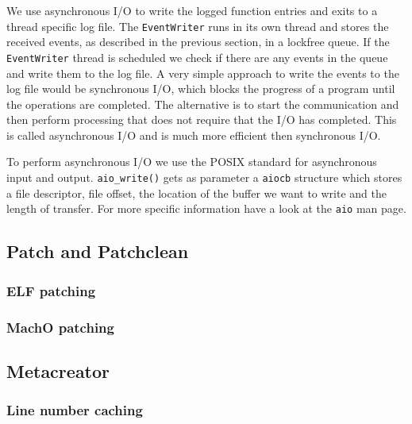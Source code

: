 We use asynchronous I/O to write the logged function entries and exits to a thread specific log file. The \verb=EventWriter= runs in its own thread and stores the received events, as described in the previous section, in a lockfree queue. If the \verb=EventWriter= thread is scheduled we check if there are any events in the queue and write them to the log file. A very simple approach to write the events to the log file would be synchronous I/O, which blocks the progress of a program until the operations are completed. The alternative is to start the communication and then perform processing that does not require that the I/O has completed. This is called asynchronous I/O and is much more efficient then synchronous I/O.

To perform asynchronous I/O we use the POSIX standard for asynchronous input and output. \verb=aio_write()= gets as parameter a \verb=aiocb= structure which stores a file descriptor, file offset, the location of the buffer we want to write and the length of transfer. For more specific information have a look at the \verb=aio= man page.

\subsection{Patch and Patchclean} 

\subsubsection{ELF patching} 

\subsubsection{MachO patching}

\subsection{Metacreator} 

\subsubsection{Line number caching} 
